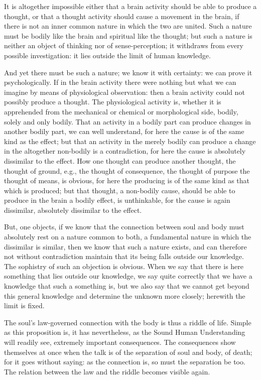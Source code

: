 \documentclass[12pt,a4paper,openany]{book}
\newcommand{\opage}[1]{\marginnote{\footnotesize\textit{[#1]}}}
\begin{document}
\setcounter{footnote}{0}%
\opage{397}It is altogether impossible either that a brain activity
should be able to produce a thought, or that a thought activity
should cause a movement in the brain, if
there is not an inner common nature in which the two are united.
Such a nature must be bodily like the brain
and spiritual like the thought; but such a nature is
neither an object of thinking nor of sense-perception;
it withdraws from every possible investigation: it lies outside the limit of human knowledge.

And yet there must be such a nature; we know
it with certainty: we can prove it psychologically. If
in the brain activity there were nothing but what we can
imagine by means of physiological observation:
then a brain activity could not possibly produce
a thought. The physiological activity is, whether
it is apprehended from the mechanical or chemical or
morphological side, bodily, solely and only bodily. That
an activity in a bodily part can produce
changes in another bodily part, we can well understand,
for here the cause is of the same kind as the effect;
but that an activity in the merely bodily can produce
a change in the altogether non-bodily is a
contradiction, for here the cause is absolutely dissimilar to
the effect. How one thought can produce
another thought, the thought of ground, e.g., the thought of
consequence, the thought of purpose the thought of means, is obvious,
for here the producing is of the same kind as that
which is produced; but that thought, a non-bodily cause,
should be able to produce in the brain a bodily effect,
is unthinkable, for the cause is again dissimilar,
absolutely dissimilar to the effect.

\setcounter{footnote}{0}%
\opage{398}But, one objects, if we know that the connection
between soul and body must absolutely rest on
a nature common to both, a fundamental nature in which the
dissimilar is similar, then we know that such a
nature exists, and can therefore not without contradiction maintain
that its being falls outside our knowledge. The
sophistry of such an objection is obvious. When
we say that there is here something that lies outside our
knowledge, we say quite correctly that we have a knowledge
that such a something is, but we also say that
we cannot get beyond this general knowledge and
determine the unknown more closely; herewith the limit is
fixed.

The soul's law-governed connection with the body is
thus a riddle of life. Simple as this proposition
is, it has nevertheless, as the Sound Human Understanding
will readily see, extremely important consequences. The consequences show
themselves at once when the talk is of the separation of soul
and body, of death; for it goes without saying:
as the connection is, so must the separation be too. The relation
between the law and the riddle becomes visible again.
\end{document}

